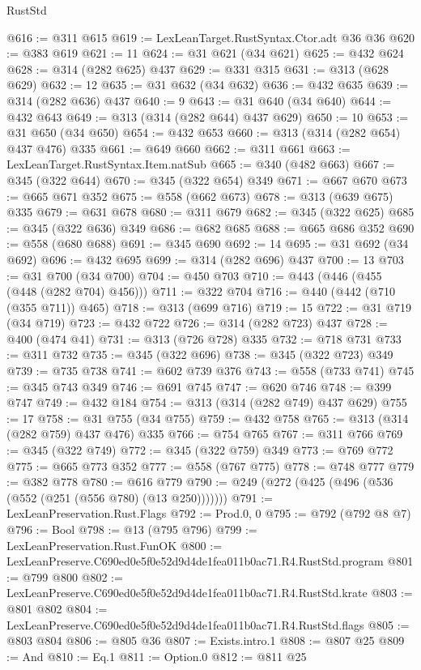 \begin{lexlean}{RustStd}
\begin{coremodule}
@616 := @311 @615
@619 := LexLeanTarget.RustSyntax.Ctor.adt @36 @36
@620 := @383 @619
@621 := 11
@624 := @31 @621 (@34 @621)
@625 := @432 @624
@628 := @314 (@282 @625) @437
@629 := @331 @315
@631 := @313 (@628 @629)
@632 := 12
@635 := @31 @632 (@34 @632)
@636 := @432 @635
@639 := @314 (@282 @636) @437
@640 := 9
@643 := @31 @640 (@34 @640)
@644 := @432 @643
@649 := @313 (@314 (@282 @644) @437 @629)
@650 := 10
@653 := @31 @650 (@34 @650)
@654 := @432 @653
@660 := @313 (@314 (@282 @654) @437 @476) @335
@661 := @649 @660
@662 := @311 @661
@663 := LexLeanTarget.RustSyntax.Item.natSub
@665 := @340 (@482 @663)
@667 := @345 (@322 @644)
@670 := @345 (@322 @654) @349
@671 := @667 @670
@673 := @665 @671 @352
@675 := @558 (@662 @673)
@678 := @313 (@639 @675) @335
@679 := @631 @678
@680 := @311 @679
@682 := @345 (@322 @625)
@685 := @345 (@322 @636) @349
@686 := @682 @685
@688 := @665 @686 @352
@690 := @558 (@680 @688)
@691 := @345 @690
@692 := 14
@695 := @31 @692 (@34 @692)
@696 := @432 @695
@699 := @314 (@282 @696) @437
@700 := 13
@703 := @31 @700 (@34 @700)
@704 := @450 @703
@710 := @443 (@446 (@455 (@448 (@282 @704) @456)))
@711 := @322 @704
@716 := @440 (@442 (@710 (@355 @711)) @465)
@718 := @313 (@699 @716)
@719 := 15
@722 := @31 @719 (@34 @719)
@723 := @432 @722
@726 := @314 (@282 @723) @437
@728 := @400 (@474 @41)
@731 := @313 (@726 @728) @335
@732 := @718 @731
@733 := @311 @732
@735 := @345 (@322 @696)
@738 := @345 (@322 @723) @349
@739 := @735 @738
@741 := @602 @739 @376
@743 := @558 (@733 @741)
@745 := @345 @743 @349
@746 := @691 @745
@747 := @620 @746
@748 := @399 @747
@749 := @432 @184
@754 := @313 (@314 (@282 @749) @437 @629)
@755 := 17
@758 := @31 @755 (@34 @755)
@759 := @432 @758
@765 := @313 (@314 (@282 @759) @437 @476) @335
@766 := @754 @765
@767 := @311 @766
@769 := @345 (@322 @749)
@772 := @345 (@322 @759) @349
@773 := @769 @772
@775 := @665 @773 @352
@777 := @558 (@767 @775)
@778 := @748 @777
@779 := @382 @778
@780 := @616 @779
@790 := @249 (@272 (@425 (@496 (@536 (@552 (@251 (@556 @780) (@13 @250)))))))
@791 := LexLeanPreservation.Rust.Flags
@792 := Prod.{0, 0}
@795 := @792 (@792 @8 @7)
@796 := Bool
@798 := @13 (@795 @796)
@799 := LexLeanPreservation.Rust.FunOK
@800 := LexLeanPreserve.C690ed0e5f0e52d9d4de1fea011b0ac71.R4.RustStd.program
@801 := @799 @800
@802 := LexLeanPreserve.C690ed0e5f0e52d9d4de1fea011b0ac71.R4.RustStd.krate
@803 := @801 @802
@804 := LexLeanPreserve.C690ed0e5f0e52d9d4de1fea011b0ac71.R4.RustStd.flags
@805 := @803 @804
@806 := @805 @36
@807 := Exists.intro.{1}
@808 := @807 @25
@809 := And
@810 := Eq.{1}
@811 := Option.{0}
@812 := @811 @25

\end{coremodule}
\end{lexlean}
